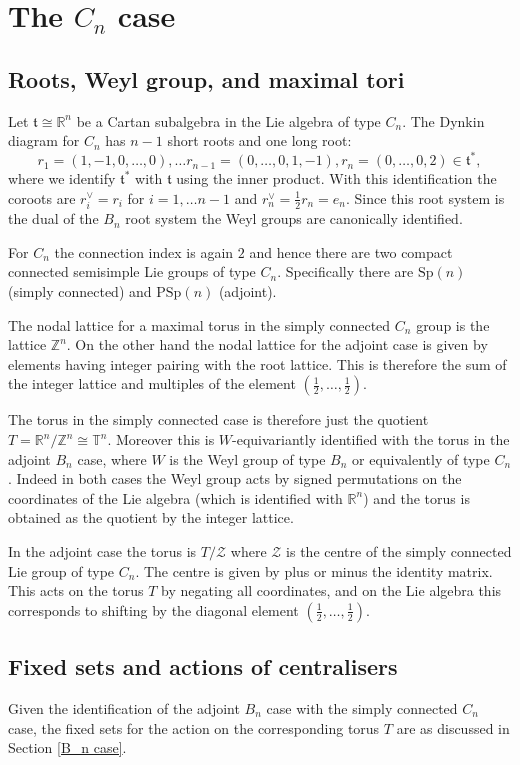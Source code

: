 \documentclass[11pt,a4paper]{article}
\def\Sp{\mathrm{Sp}}
\def\PSp{\mathrm{PSp}}
\def\t{\mathfrak t}
\def\R{\mathbb{R}}
\def\Z{\mathbb{Z}}
\def\TT{\mathbb{T}}
\def\cZ{\mathcal{Z}}
\def\cZ{{\mathcal Z}}
\begin{document}
\section{The $C_n$ case}\label{C_n case}

\subsection{Roots, Weyl group, and maximal tori}
Let $\t\cong \R^n$ be a Cartan subalgebra in the Lie algebra of type $C_n$. The Dynkin diagram for $C_n$ has $n-1$ short roots and one long root:
\[
r_1=(1,-1,0,\dots,0),\dots r_{n-1}=(0,\dots,0,1,-1), r_n=(0,\dots ,0,2)\in \t^*,
\]
where we identify $\t^*$ with $\t$ using the inner product.  With this identification the coroots are $r_i^\vee = r_i$ for $i=1,\dots n-1$ and $r_n^\vee=\frac 12 r_n=e_n$.  Since this root system is the dual of the $B_n$ root system the Weyl groups are canonically identified.

\bigskip

For $C_n$ the connection index is again $2$ and hence there are two compact connected semisimple Lie groups of type $C_n$.  Specifically there are $\Sp(n)$ (simply connected) and $\PSp(n)$ (adjoint).
\bigskip

The nodal lattice for a maximal torus in the simply connected $C_n$ group is the lattice  $\Z^n$.  On the other hand the nodal lattice for the adjoint case is given by elements having integer pairing with the root lattice. This is therefore the sum of the integer lattice and multiples of the element $(\frac 12,\dots,\frac 12)$.


    The torus in the simply connected case is therefore just the quotient $T=\R^n/\Z^n \cong \TT^n$. Moreover this is $W$-equivariantly identified with the torus in the adjoint $B_n$ case, where $W$ is the Weyl group of type $B_n$ or equivalently of type $C_n$.  Indeed in both cases the Weyl group acts by signed permutations on the coordinates of the Lie algebra (which is identified with $\R^n$) and the torus is obtained as the quotient by the integer lattice.

    In the adjoint case the torus is $T/\cZ$ where $\cZ$ is the centre of the simply connected Lie group of type $C_n$. The centre is given by plus or minus the identity matrix.  This acts on the torus $T$ by negating all coordinates, and on the Lie algebra this corresponds to shifting by the diagonal element $( \frac 12,\dots,\frac 12)$.
    
    \subsection{Fixed sets and actions of centralisers}
    Given the identification of the adjoint $B_n$ case with the simply connected $C_n$ case, the fixed sets for the action on the corresponding torus $T$ are as discussed in Section \ref{B_n case}.
    
\end{document}
